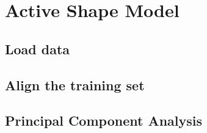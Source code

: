 \section{Active Shape Model}

\subsection{Load data}

\subsection{Align the training set}

\subsection{Principal Component Analysis}